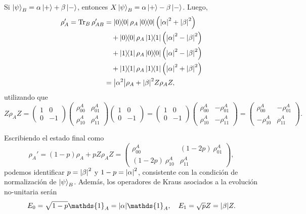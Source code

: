 \documentclass{scrartcl}
\DeclareRobustCommand{\[}{\begin{equation}}
\DeclareRobustCommand{\]}{\end{equation}}
\begin{document}
\begin{enumerate}
\begin{enumerate}[a)]
        Si $\ket{\psi}_B = \alpha \ket{+} + \beta \ket{-}$, entonces $X \ket{\psi}_B = \alpha \ket{+} - \beta \ket{-}$. Luego,
        \begin{align}
            \rho_A' = \Tr_B \rho_{AB}' &= \dyad{0}{0} \rho_A \dyad{0}{0} \qty(\abs{\alpha}^2 + \abs{\beta}^2) \\
                &\quad + \dyad{0}{0} \rho_A \dyad{1}{1} \qty(\abs{\alpha}^2 - \abs{\beta}^2) \\
                &\quad + \dyad{1}{1} \rho_A \dyad{0}{0} \qty(\abs{\alpha}^2 - \abs{\beta}^2) \\
                &\quad + \dyad{1}{1} \rho_A \dyad{1}{1} \qty(\abs{\alpha}^2 + \abs{\beta}^2) \\
                &= \abs{\alpha^2} \rho_A + \abs{\beta}^2 Z \rho_A Z,
        \end{align}
        utilizando que
        \[
            Z \rho_A Z = \begin{pmatrix} 1 & 0 \\ 0 & -1 \end{pmatrix} \begin{pmatrix} \rho^A_{00} & \rho^A_{01} \\ \rho^A_{10} & \rho^A_{11} \end{pmatrix} \begin{pmatrix} 1 & 0 \\ 0 & -1 \end{pmatrix} = \begin{pmatrix} 1 & 0 \\ 0 & -1 \end{pmatrix} \begin{pmatrix} \rho^A_{00} & -\rho^A_{01} \\ \rho^A_{10} & -\rho^A_{11} \end{pmatrix} = \begin{pmatrix} \rho^A_{00} & -\rho^A_{01} \\ -\rho^A_{10} & \rho^A_{11} \end{pmatrix}.
        \]
        
        Escribiendo el estado final como
        \[ \rho_A' = (1 - p) \rho_A + p Z \rho_A Z =
            \begin{pmatrix}
                \rho^A_{00} & (1 - 2p) \ \rho^A_{01} \\
                (1 - 2p) \ \rho^A_{10} & \rho^A_{11}
            \end{pmatrix}, \label{eq:I_2_a_1}
        \]
        podemos identificar $p = \abs{\beta}^2$ y $1 - p = \abs{\alpha}^2$, consistente con la condición de normalización de $\ket{\psi}_B$. Además, los operadores de Kraus asociados a la evolución no-unitaria serán
        \[ E_0 = \sqrt{1 - p} \mathds{1}_A = \abs{\alpha} \mathds{1}_A, \quad E_1 = \sqrt{p} Z = \abs{\beta} Z. \]
        

\end{enumerate}
\end{enumerate}
\end{document}
